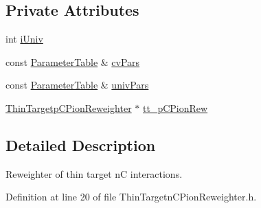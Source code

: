 \subsection*{Private Attributes}
\begin{DoxyCompactItemize}
\item 
int \hyperlink{class_neutrino_flux_reweight_1_1_thin_targetn_c_pion_reweighter_a4739c4b376e4e9d4a1b6968efddf41d8}{i\-Univ}
\item 
const \hyperlink{class_neutrino_flux_reweight_1_1_parameter_table}{Parameter\-Table} \& \hyperlink{class_neutrino_flux_reweight_1_1_thin_targetn_c_pion_reweighter_ab843f2f08ded4f483a4f80f9ee3488ed}{cv\-Pars}
\item 
const \hyperlink{class_neutrino_flux_reweight_1_1_parameter_table}{Parameter\-Table} \& \hyperlink{class_neutrino_flux_reweight_1_1_thin_targetn_c_pion_reweighter_a0ff3aa1a33a5e28c56f43ab9e6fa02b3}{univ\-Pars}
\item 
\hyperlink{class_neutrino_flux_reweight_1_1_thin_targetp_c_pion_reweighter}{Thin\-Targetp\-C\-Pion\-Reweighter} $\ast$ \hyperlink{class_neutrino_flux_reweight_1_1_thin_targetn_c_pion_reweighter_a3cd598e2a95c1cf40db298236f3551c9}{tt\-\_\-p\-C\-Pion\-Rew}
\end{DoxyCompactItemize}


\subsection{Detailed Description}
Reweighter of thin target n\-C interactions. 

Definition at line 20 of file Thin\-Targetn\-C\-Pion\-Reweighter.\-h.



